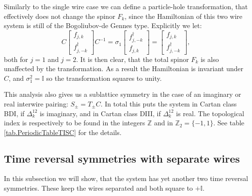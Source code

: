 Similarly to the single wire case we can define a particle-hole transformation, that effectively does not change the spinor $F_k$, since the Hamiltonian of this two wire system is still of the Bogoliubov-de Gennes type. Explicitly we let:
\begin{equation}
C\begin{bmatrix} f_{j,k} \\ f^\dagger_{j,-k} \end{bmatrix}C^{-1} = \sigma_1 \begin{bmatrix} f^\dagger_{j,-k} \\ f_{j,k} \end{bmatrix} = \begin{bmatrix} f_{j,k} \\ f^\dagger_{j,-k} \end{bmatrix}, 
\end{equation} 
both for $j=1$ and $j=2$. It is then clear, that the total spinor $F_k$ is also unaffected by the transformation. As a result the Hamiltonian is invariant under $C$, and $\sigma_1^2 = \mathbb{I}$ so the transformation squares to unity. 

This analysis also gives us a sublattice symmetry in the case of an imaginary or real interwire pairing: $S_\pm = T_\pm C$. In total this puts the system in Cartan class BDI, if $\Delta^{12}_k$ is imaginary, and in Cartan class DIII, if $\Delta^{12}_k$ is real. The topological index is respectively to be found in the integers $\mathbb{Z}$ and in $\mathbb{Z}_2 = \{-1,1\}$. See table \ref{tab.PeriodicTableTISC} for the details. 

\subsection{Time reversal symmetries with separate wires}
In this subsection we will show, that the system has yet another two time reversal symmetries. These keep the wires separated and both square to $+\mathbb{I}$. 


